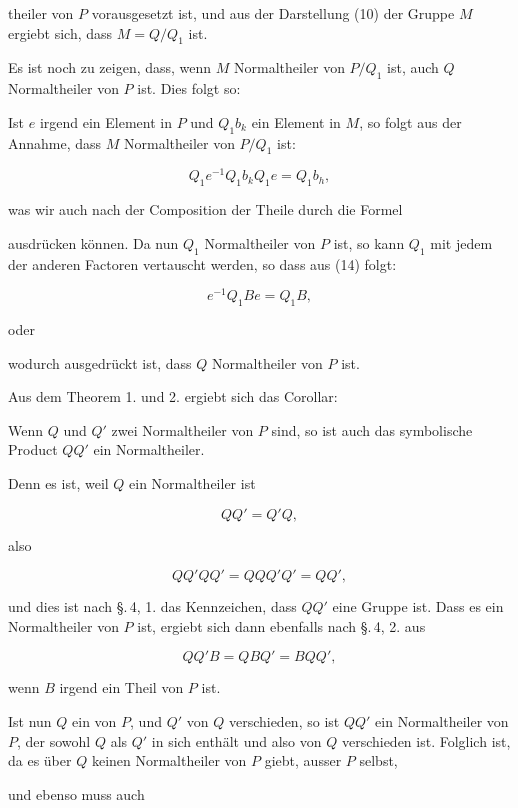 theiler von $P$ vorausgesetzt ist, und aus der Darstellung (10)
der Gruppe $M$ ergiebt sich, dass $M = Q/Q_1$ ist.

Es ist noch zu zeigen, dass, wenn $M$ Normaltheiler von
$P/Q_1$ ist, auch $Q$ Normaltheiler von $P$ ist. Dies folgt so:

Ist $e$ irgend ein Element in $P$ und $Q_1 b_k$ ein Element in $M$,
so folgt aus der Annahme, dass $M$ Normaltheiler von $P/Q_1$ ist:

\[ Q_1 e^{-1} Q_1 b_k Q_1 e = Q_1 b_h, \]

was wir auch nach der Composition der Theile durch die Formel


ausdrücken können. Da nun $Q_1$ Normaltheiler von $P$ ist, so
kann $Q_1$ mit jedem der anderen Factoren vertauscht werden, so
dass aus (14) folgt:

\[ e^{-1} Q_1 B e = Q_1 B, \]

oder


wodurch ausgedrückt ist, dass $Q$ Normaltheiler von $P$ ist.

Aus dem Theorem 1. und 2. ergiebt sich das Corollar:


Wenn $Q$ und $Q'$ zwei Normaltheiler von $P$ sind, so ist auch
das symbolische Product $Q Q'$ ein Normaltheiler.

Denn es ist, weil $Q$ ein Normaltheiler ist

\[ Q Q' = Q' Q, \]

also

\[ Q Q' Q Q' = Q Q Q' Q' = Q Q', \]

und dies ist nach \S.\,4, 1. das Kennzeichen, dass $Q Q'$ eine Gruppe
ist. Dass es ein Normaltheiler von $P$ ist, ergiebt sich dann
ebenfalls nach \S.\,4, 2. aus

\[ Q Q' B = Q B Q' = B Q Q', \]

wenn $B$ irgend ein Theil von $P$ ist.

Ist nun $Q$ ein  von $P$, und $Q'$ von
$Q$ verschieden, so ist $Q Q'$ ein Normaltheiler von $P$, der sowohl
$Q$ als $Q'$ in sich enthält und also von $Q$ verschieden ist.
Folglich ist, da es über $Q$ keinen Normaltheiler von $P$ giebt,
ausser $P$ selbst,


und ebenso muss auch

